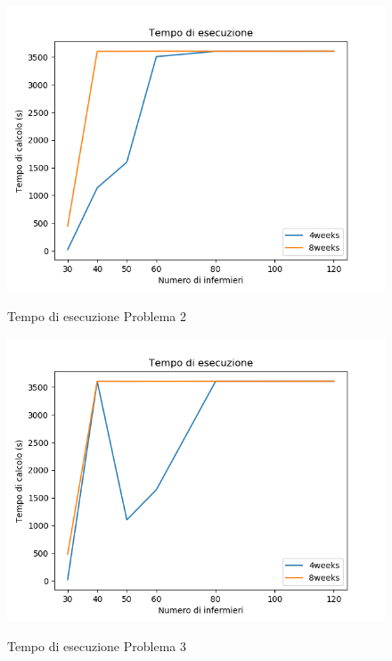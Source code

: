 \begin{figure}[H]
\begin{center}
  \includegraphics[scale=0.5]{img/Problema2/Time_1h-h0_w4.png}\\
  \caption{Tempo di esecuzione Problema 2}
\end{center}
\end{figure}

\begin{figure}[H]
\begin{center}
  \includegraphics[scale=0.5]{img/Problema3/Time_1h-h1_w0.png}\\
  \caption{Tempo di esecuzione Problema 3}
\end{center}
\end{figure}


